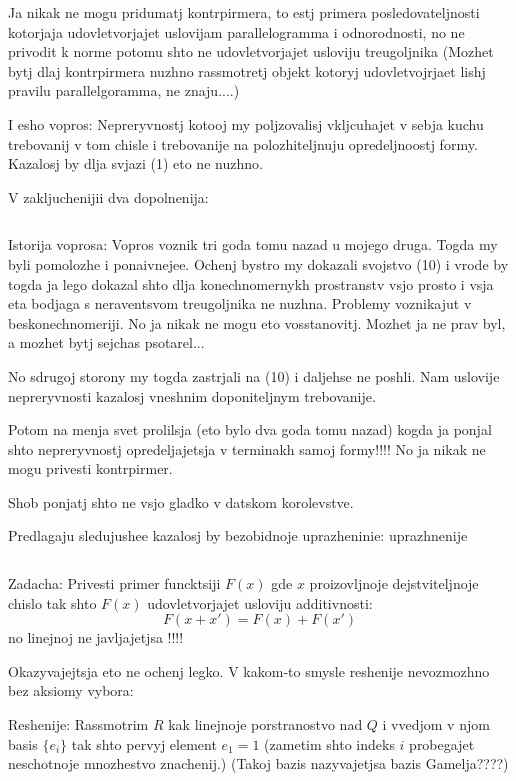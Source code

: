 Ja nikak ne mogu pridumatj kontrpirmera, to estj primera posledovateljnosti
kotorjaja udovletvorjajet uslovijam parallelogramma i odnorodnosti,
no ne privodit k norme potomu shto ne udovletvorjajet usloviju treugoljnika
(Mozhet bytj dlaj kontrpirmera nuzhno rassmotretj objekt kotoryj udovletvojrjaet
lishj pravilu parallelgoramma, ne znaju....)

I esho vopros: Nepreryvnostj kotooj my poljzovalisj
vkljcuhajet v sebja kuchu trebovanij v tom chisle i trebovanije
na polozhiteljnuju opredeljnoostj formy.
Kazalosj by dlja svjazi (1) eto ne nuzhno.


V zakljuchenijii dva dopolnenija:

  $$ $$

  Istorija voprosa: Vopros voznik tri goda tomu nazad u mojego druga.
  Togda my byli pomolozhe i ponaivnejee. Ochenj bystro my dokazali
  svojstvo  (10) i vrode by togda ja lego dokazal shto dlja konechnomernykh
  prostranstv vsjo prosto i vsja eta bodjaga s neraventsvom treugoljnika ne nuzhna.
  Problemy voznikajut v beskonechnomeriji. No ja nikak ne mogu eto vosstanovitj.
  Mozhet ja ne prav byl, a mozhet bytj sejchas psotarel...



  No sdrugoj storony my togda zastrjali na (10) i daljehse ne poshli.
  Nam uslovije nepreryvnosti kazalosj vneshnim doponiteljnym trebovanije.

  Potom na menja svet prolilsja (eto bylo dva goda tomu nazad)
  kogda ja ponjal shto nepreryvnostj opredeljajetsja v terminakh
  samoj formy!!!!
  No ja nikak ne mogu privesti kontrpirmer.

  Shob ponjatj shto ne vsjo gladko v datskom korolevstve.

  Predlagaju sledujushee kazalosj by bezobidnoje uprazheninie:
  uprazhnenije


   $$ $$

   Zadacha: Privesti primer funcktsiji $F(x)$ gde $x$ proizovljnoje dejstviteljnoje chislo
   tak shto $F(x)$ udovlet\-vo\-rjajet usloviju additivnosti:
                     $$
                     F(x+x')=F(x)+F(x')
                   $$
     no linejnoj ne javljajetjsa !!!!

     Okazyvajejtsja eto ne ochenj legko. V kakom-to smysle reshenije
     nevozmozhno bez aksiomy vybora:

      Reshenije: Rassmotrim $R$ kak linejnoje porstranostvo
      nad $Q$ i vvedjom v njom basis $\{e_i\}$ tak shto pervyj element $e_1=1$
       (zametim shto indeks $i$
      probegajet neschotnoje mnozhestvo znachenij.) (Takoj bazis nazyvajetjsa
      bazis Gamelja????)

